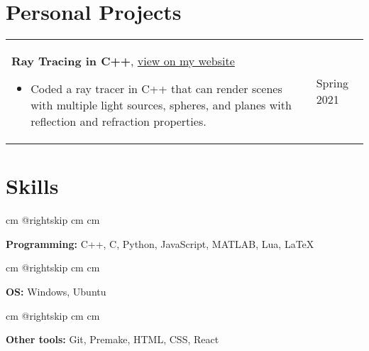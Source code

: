 \documentclass[10pt, a4paper]{article}
\newenvironment{highlights}{
        \begin{itemize}[
                topsep=0pt,
                parsep=0.07 cm,
                partopsep=0pt,
                itemsep=0pt,
                after=\vspace*{-1\baselineskip},
                leftmargin=0.6 cm + 3pt
            ]
    }{
        \end{itemize}
    } %
\let\hrefWithoutArrow\href
\renewcommand{\href}[2]{\hrefWithoutArrow{#1}{#2 \raisebox{.15ex}{\footnotesize \faExternalLink*}}}
\begin{document}
    \section{Personal Projects}
    
        \begin{tabularx}{ cm-0.13cm}{K{0.2 cm} R{3.6 cm}}
            \textbf{Ray Tracing in C++}, \href{https://example.com/}{view on my website}
            \vspace*{0.12 cm}
            \begin{highlights}
                \item Coded a ray tracer in C++ that can render scenes with multiple light sources, spheres, and planes with reflection and refraction properties. \hspace*{-0.2cm}
            \end{highlights}
        &
            Spring 2021
        \end{tabularx}



    \section{Skills}
    
            \begingroup\raggedright
             cm
            \advance\csname @rightskip cm
            \advance{} cm

            \textbf{Programming:} C++, C, Python, JavaScript, MATLAB, Lua, LaTeX

            \par\endgroup

        \vspace*{0.12 cm}
        
            \begingroup\raggedright
             cm
            \advance\csname @rightskip cm
            \advance{} cm

            \textbf{OS:} Windows, Ubuntu

            \par\endgroup

        \vspace*{0.12 cm}
        
            \begingroup\raggedright
             cm
            \advance\csname @rightskip cm
            \advance{} cm

            \textbf{Other tools:} Git, Premake, HTML, CSS, React
\end{document}
